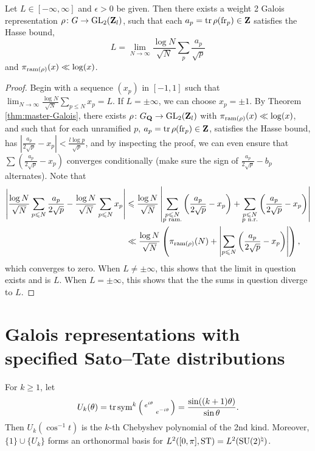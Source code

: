 \begin{corollary}
Let $L \in [-\infty,\infty]$ and $\epsilon>0$ be given. Then there exists a 
weight 2 Galois representation $\rho\colon G\to \operatorname{GL}_2(\mathbf{Z}_l)$, such that 
each $a_p = \operatorname{tr}\rho(\mathrm{fr}_p)\in \mathbf{Z}$ satisfies the Hasse bound, 
\[
	L = \lim_{N\to \infty} \frac{\log N}{\sqrt N}\sum_p \frac{a_p}{\sqrt p} 
\]
and $\pi_{\mathrm{ram}(\rho)}(x) \ll \log(x)$. 
\end{corollary}
\begin{proof}
Begin with a sequence $(x_p)$ in $[-1,1]$ such that 
$\lim_{N\to \infty} \frac{\log N}{\sqrt N}\sum_{p\leqslant N} x_p = L$. If 
$L=\pm \infty$, we can choose $x_p = \pm 1$. By Theorem 
\ref{thm:master-Galois}, there exists $\rho\colon G_{\mathbf{Q}} \to \operatorname{GL}_2(\mathbf{Z}_l)$ with 
$\pi_{\mathrm{ram}(\rho)}(x) \ll \log(x)$, and such that for each unramified $p$, 
$a_p = \operatorname{tr}\rho(\mathrm{fr}_p)\in \mathbf{Z}$, satisfies the Hasse bound, has 
$\left| \frac{a_p}{2\sqrt p} - x_p\right| < \frac{l \log p}{\sqrt p}$, and by 
inspecting the proof, we can even ensure that 
$\sum \left(\frac{a_p}{2\sqrt p} - x_p\right)$ converges conditionally (make 
sure the sign of $\frac{a_p}{2\sqrt p} - b_p$ alternates). Note that
\begin{align*}
	\left|\frac{\log N}{\sqrt N}\sum_{p\leqslant N} \frac{a_p}{2\sqrt p} - \frac{\log N}{\sqrt N} \sum_{p\leqslant N} x_p\right| 
		&\leqslant \frac{\log N}{\sqrt N}\left|\sum_{\substack{p\leqslant N \\ p\text{ ram.}}} \left(\frac{a_p}{2 \sqrt p} - x_p\right) + \sum_{\substack{p\leqslant N \\ p\text{ n.r.}}} \left(\frac{a_p}{2 \sqrt p} - x_p\right) \right|  \\
		&\ll \frac{\log N}{\sqrt N} \left(\pi_{\mathrm{ram}(\rho)}(N) + \left|\sum_{p\leqslant N} \left(\frac{a_p}{2 \sqrt p} - x_p\right)\right|\right) ,
\end{align*}
which converges to zero. 
When $L\ne \pm\infty$, this shows that the limit in question exists and is $L$. 
When $L=\pm \infty$, this shows that the the sums in question diverge to $L$. 
\end{proof}





\section{Galois representations with specified Sato--Tate distributions}

For $k\geqslant 1$, let 
\[
	U_k(\theta) = \operatorname{tr}\operatorname{sym}^k\left(\begin{smallmatrix} e^{i\theta} &  \\  & e^{- i \theta} \end{smallmatrix}\right) = \frac{\sin((k+1)\theta)}{\sin\theta} .
\]
Then $U_k(\cos^{-1} t)$ is the $k$-th Chebyshev polynomial of the 2nd kind. 
Moreover, $\{1\}\cup\{U_k\}$ forms an orthonormal basis for 
$L^2([0,\pi],\mathrm{ST}) = L^2(\operatorname{SU}(2)^\natural)$. 

